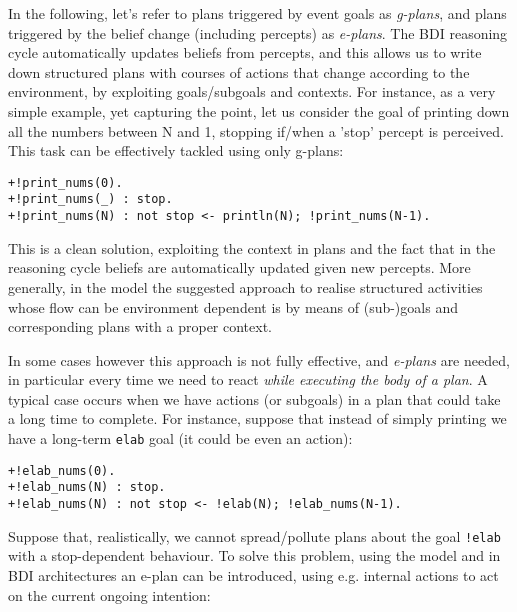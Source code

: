 %
%
%
In the following, let's refer to plans triggered by event goals
as \emph{g-plans}, and plans triggered by the
belief change (including percepts) as \emph{e-plans}.
%
The BDI reasoning cycle automatically updates beliefs from percepts,
and this allows us to write down structured plans with courses of
actions that change according to the environment, by exploiting
goals/subgoals and contexts.
%
For instance, as a very simple example, yet capturing the point, let
us consider the goal of printing down all the numbers between N and 1,
stopping if/when a 'stop' percept is perceived.
%
This task can be effectively tackled using only g-plans:

\begin{small}
\begin{verbatim}
+!print_nums(0).
+!print_nums(_) : stop.
+!print_nums(N) : not stop <- println(N); !print_nums(N-1).
\end{verbatim}
\end{small}
	
\noindent This is a clean solution, exploiting the context in plans
and the fact that in the reasoning cycle beliefs are automatically
updated given new percepts.
%
More generally, in the {\asl} model the suggested approach to realise
structured activities whose flow can be environment dependent is by
means of (sub-)goals and corresponding plans with a proper context.

In some cases however this approach is not fully effective, and
\emph{e-plans} are needed,
%
in particular every time we need to react \emph{while executing the
  body of a plan}.
%
A typical case occurs when we have actions (or subgoals) in a plan
that could take a long time to complete.
%
For instance, suppose that instead of simply printing we have a
long-term \texttt{elab} goal (it could be even an action):

\begin{small}
\begin{verbatim}
+!elab_nums(0).
+!elab_nums(N) : stop. 
+!elab_nums(N) : not stop <- !elab(N); !elab_nums(N-1).
\end{verbatim}
\end{small}

\noindent Suppose that, realistically, we cannot spread/pollute plans
about the goal \texttt{!elab} with a stop-dependent behaviour.
%
To solve this problem, using the {\asl} model and in BDI architectures
an e-plan can be introduced, using e.g. internal actions to act on the
current ongoing intention:

